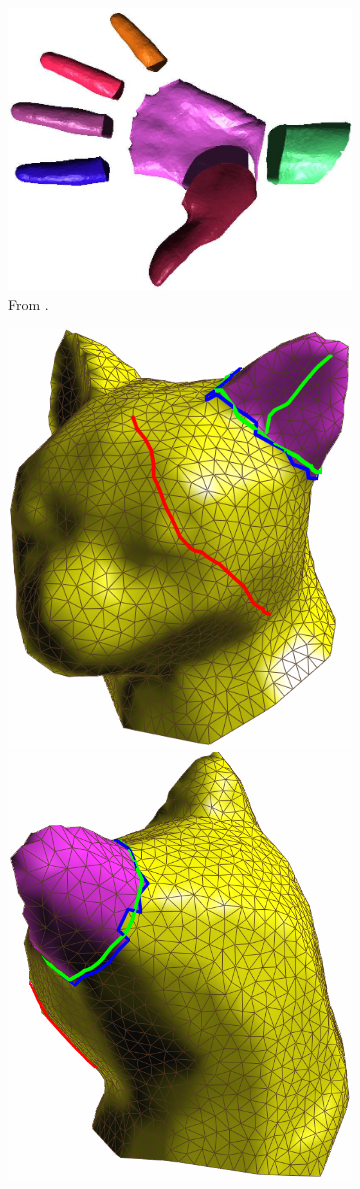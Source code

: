 \documentclass{stdlocal}
\begin{document}
\begin{figure}[b]
\begin{subfigure}[b]{0.32\linewidth}
    \bigskip
    \includegraphics[width=0.85\linewidth]{images/lee2004-2.png}
    \caption{From \textcite{lee2004}.}
    \label{fig:introduction-examples-lee2004}
  \end{subfigure}
  \hfill
  \begin{subfigure}[b]{0.32\linewidth}
    \centering
    \includegraphics[width=0.6\linewidth]{images/ji2006-1.png}
    \includegraphics[width=0.6\linewidth]{images/ji2006-2.png}

\end{subfigure}
\end{figure}
\end{document}
